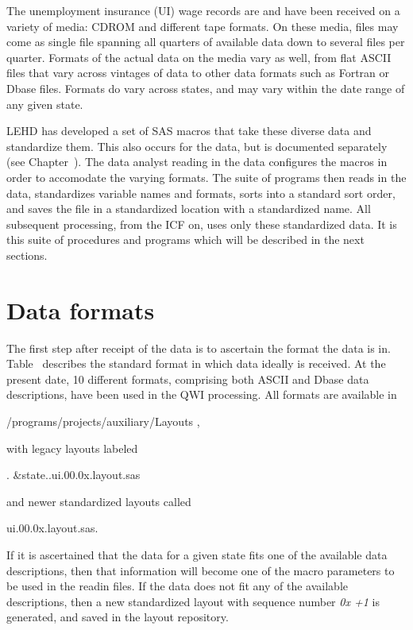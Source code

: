                       
%
%

The unemployment insurance (UI) wage records are and have been
received on a variety of media: CDROM and different
tape formats. On these media, files may come as single file
spanning all quarters of available data down to several files per quarter.
Formats of the actual data on the media vary as well, from flat
ASCII files that vary across vintages of data to other data
formats such as Fortran or Dbase files. Formats do vary
across states, and may vary within the date range of any given state.

LEHD has developed a set of SAS macros that take these diverse data and
standardize them. This also occurs for the  data, but is documented
separately (see Chapter~). The data analyst
reading in the data configures the  macros in order to accomodate the
varying formats. The suite of programs then reads in the data, standardizes
variable names and formats, sorts into a standard sort order, and saves the
file in a standardized location with a standardized name. All subsequent
processing, from the ICF on, uses only these standardized data. It is this
suite of procedures and programs which will be described in the next sections.

\section{Data formats\label{app:ui_formats}}

The first step after receipt of the data is to ascertain the format the
data is in. Table~ describes the standard format in
which data ideally is received. At the present date, 10 different
formats, comprising both ASCII and Dbase data descriptions, have been used
in the QWI processing. All formats are available in 
\begin{center}
/programs/projects/auxiliary/Layouts  ,
\end{center}
with legacy layouts labeled 
\begin{center}
 . \&state..ui.00.0x.layout.sas
\end{center}
and newer standardized layouts called
\begin{center}
  ui.00.0x.layout.sas.
\end{center}
If it is ascertained that the data for a given state fits one of the
available data descriptions, then that information will become one of the
macro parameters to be used in the readin files. If the data does not fit
any of the available descriptions, then a new standardized layout with
sequence number \textit{0x +1} is generated, and saved in the layout repository.

